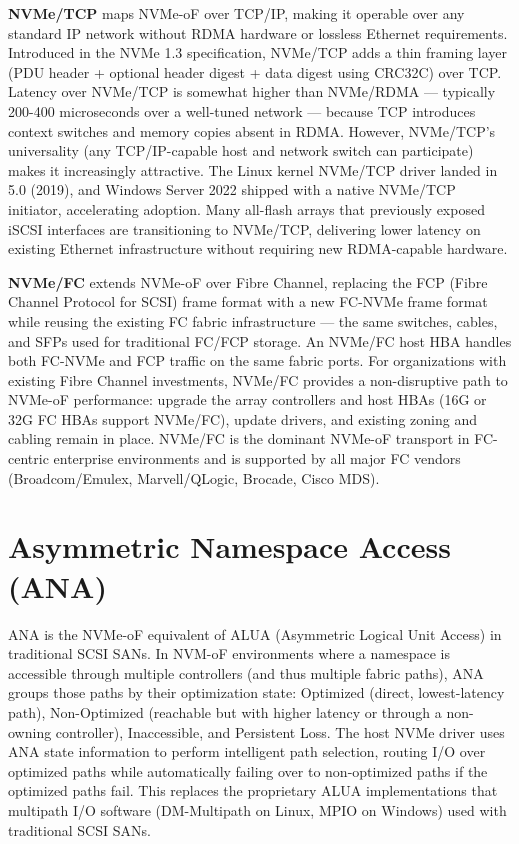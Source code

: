 \textbf{NVMe/TCP} maps NVMe-oF over TCP/IP, making it operable over any standard IP network without RDMA hardware or lossless Ethernet requirements. Introduced in the NVMe 1.3 specification, NVMe/TCP adds a thin framing layer (PDU header + optional header digest + data digest using CRC32C) over TCP. Latency over NVMe/TCP is somewhat higher than NVMe/RDMA --- typically 200-400 microseconds over a well-tuned network --- because TCP introduces context switches and memory copies absent in RDMA. However, NVMe/TCP's universality (any TCP/IP-capable host and network switch can participate) makes it increasingly attractive. The Linux kernel NVMe/TCP driver landed in 5.0 (2019), and Windows Server 2022 shipped with a native NVMe/TCP initiator, accelerating adoption. Many all-flash arrays that previously exposed iSCSI interfaces are transitioning to NVMe/TCP, delivering lower latency on existing Ethernet infrastructure without requiring new RDMA-capable hardware.

\textbf{NVMe/FC} extends NVMe-oF over Fibre Channel, replacing the FCP (Fibre Channel Protocol for SCSI) frame format with a new FC-NVMe frame format while reusing the existing FC fabric infrastructure --- the same switches, cables, and SFPs used for traditional FC/FCP storage. An NVMe/FC host HBA handles both FC-NVMe and FCP traffic on the same fabric ports. For organizations with existing Fibre Channel investments, NVMe/FC provides a non-disruptive path to NVMe-oF performance: upgrade the array controllers and host HBAs (16G or 32G FC HBAs support NVMe/FC), update drivers, and existing zoning and cabling remain in place. NVMe/FC is the dominant NVMe-oF transport in FC-centric enterprise environments and is supported by all major FC vendors (Broadcom/Emulex, Marvell/QLogic, Brocade, Cisco MDS).

\section{Asymmetric Namespace Access (ANA)}
ANA is the NVMe-oF equivalent of ALUA (Asymmetric Logical Unit Access) in traditional SCSI SANs. In NVM-oF environments where a namespace is accessible through multiple controllers (and thus multiple fabric paths), ANA groups those paths by their optimization state: Optimized (direct, lowest-latency path), Non-Optimized (reachable but with higher latency or through a non-owning controller), Inaccessible, and Persistent Loss. The host NVMe driver uses ANA state information to perform intelligent path selection, routing I/O over optimized paths while automatically failing over to non-optimized paths if the optimized paths fail. This replaces the proprietary ALUA implementations that multipath I/O software (DM-Multipath on Linux, MPIO on Windows) used with traditional SCSI SANs.

